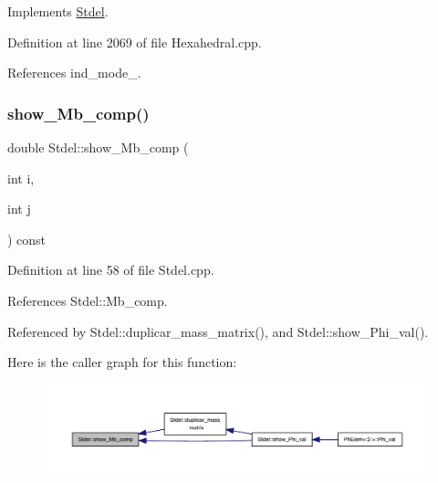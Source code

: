 Implements \hyperlink{classStdel_aa97cf7534697be1f2e02ff540ed7433b}{Stdel}.



Definition at line 2069 of file Hexahedral.\+cpp.



References ind\+\_\+mode\+\_\+.

\mbox{\label{classStdel_a4860f0f650640f859c5f75c206ee1f60}} 
\subsubsection{\texorpdfstring{show\+\_\+\+Mb\+\_\+comp()}{show\_Mb\_comp()}}
{\footnotesize\ttfamily double Stdel\+::show\+\_\+\+Mb\+\_\+comp (\begin{DoxyParamCaption}\item[{int}]{i,  }\item[{int}]{j }\end{DoxyParamCaption}) const\hspace{0.3cm}{\ttfamily [inherited]}}



Definition at line 58 of file Stdel.\+cpp.



References Stdel\+::\+Mb\+\_\+comp.



Referenced by Stdel\+::duplicar\+\_\+mass\+\_\+matrix(), and Stdel\+::show\+\_\+\+Phi\+\_\+val().

Here is the caller graph for this function\+:
\nopagebreak
\begin{figure}[H]
\begin{center}
\leavevmode
\includegraphics[width=350pt]{classStdel_a4860f0f650640f859c5f75c206ee1f60_icgraph}
\end{center}
\end{figure}
\mbox{\label{classStdel_a44d5aa234e02fb41afd5a4e5e45fadc4}} 
